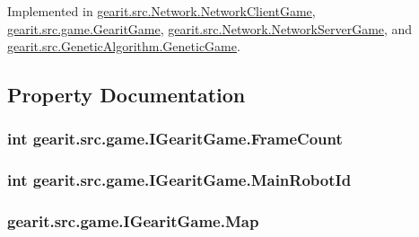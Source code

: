 Implemented in \hyperlink{classgearit_1_1src_1_1_network_1_1_network_client_game_a0f80b106b64980833b69e18aceec3fc4}{gearit.\+src.\+Network.\+Network\+Client\+Game}, \hyperlink{classgearit_1_1src_1_1game_1_1_gearit_game_a28b0c521c4aabebf1ffd371584b5d9cb}{gearit.\+src.\+game.\+Gearit\+Game}, \hyperlink{classgearit_1_1src_1_1_network_1_1_network_server_game_a7b9fbbea65c50c0c91d36c5d2047c00d}{gearit.\+src.\+Network.\+Network\+Server\+Game}, and \hyperlink{classgearit_1_1src_1_1_genetic_algorithm_1_1_genetic_game_a77b40aa7fd214187155ea6bee43569b2}{gearit.\+src.\+Genetic\+Algorithm.\+Genetic\+Game}.



\subsection{Property Documentation}
\hypertarget{interfacegearit_1_1src_1_1game_1_1_i_gearit_game_afeb5f63499a46d00260ba9e21fc125f0}{
\subsubsection[{Frame\+Count}]{\setlength{\rightskip}{0pt plus 5cm}int gearit.\+src.\+game.\+I\+Gearit\+Game.\+Frame\+Count\hspace{0.3cm}{\ttfamily [get]}}}\label{interfacegearit_1_1src_1_1game_1_1_i_gearit_game_afeb5f63499a46d00260ba9e21fc125f0}
\hypertarget{interfacegearit_1_1src_1_1game_1_1_i_gearit_game_a42d42208ffca22ea2acf221511010796}{
\subsubsection[{Main\+Robot\+Id}]{\setlength{\rightskip}{0pt plus 5cm}int gearit.\+src.\+game.\+I\+Gearit\+Game.\+Main\+Robot\+Id\hspace{0.3cm}{\ttfamily [get]}}}\label{interfacegearit_1_1src_1_1game_1_1_i_gearit_game_a42d42208ffca22ea2acf221511010796}
\hypertarget{interfacegearit_1_1src_1_1game_1_1_i_gearit_game_a59467a9b27f608b24f38c2dce7424722}{
\subsubsection[{Map}]{ gearit.\+src.\+game.\+I\+Gearit\+Game.\+Map\hspace{0.3cm}{\ttfamily [get]}}}\label{interfacegearit_1_1src_1_1game_1_1_i_gearit_game_a59467a9b27f608b24f38c2dce7424722}
